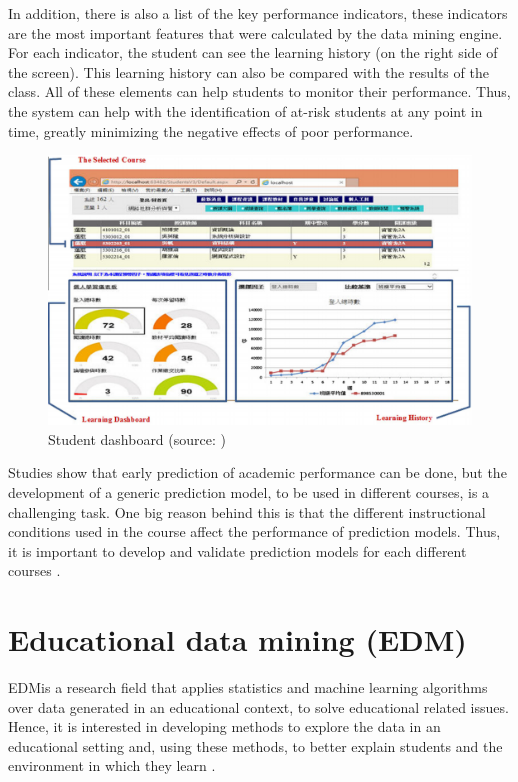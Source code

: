 In addition, there is also a list of the key performance indicators, these indicators are the most important features that were calculated by the data mining engine. For each indicator, the student can see the learning history (on the right side of the screen). This learning history can also be compared with the results of the class. All of these elements can help students to monitor their performance. Thus, the system can help with the identification of at-risk students at any point in time, greatly minimizing the negative effects of poor performance.

\begin{figure}[htb]
	\centering
  	\includegraphics[scale=.5]{Imagens/lms.png}
  	\caption{Student dashboard (source: \cite{shi2014developing})}
  	\label{fig:lms}
\end{figure}

Studies show that early prediction of academic performance can be done, but the development of a generic prediction model, to be used in different courses, is a challenging task. One big reason behind this is that the different instructional conditions used in the course affect the performance of prediction models. Thus, it is important to develop and validate prediction models for each different courses \cite{akccapinar2019using}.

\section{Educational data mining (EDM)}
\label{sc:edm}

EDMis a research field that applies statistics and machine learning algorithms over data generated in an educational context, to solve educational related issues. Hence, it is interested in developing methods to explore the data in an educational setting and, using these methods, to better explain students and the environment in which they learn \cite{romero2010educational}.

